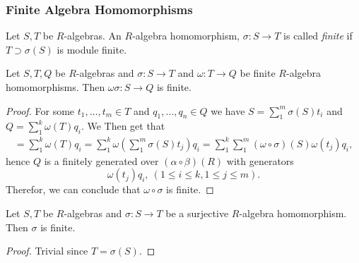 \subsubsection{Finite Algebra Homomorphisms}
    \begin{definition}
        Let $S,T$ be $R$-algebras. An $R$-algebra homomorphism, $\sigma: S\rightarrow T$ is called \textit{finite} if $T\supset \sigma(S)$ is module finite.   
    \end{definition}
    \begin{lemma}\label{CompositionOfFiniteAlgebraHomsIsFinite}
        Let $S,T,Q$ be $R$-algebras and $\sigma: S\rightarrow T$ and $\omega: T\rightarrow Q$ be finite $R$-algebra homomorphisms. Then $\omega\sigma : S\rightarrow Q$ is finite. 
    \end{lemma}
    \begin{proof}
        For some  $t_1,\dots,t_m\in T$ and $q_1,\dots,q_n\in Q$  we have $S=\sum_1^m \sigma(S)t_i$ and $Q=\sum_1^k \omega(T)q_i$. We Then get that 
        \begin{align*}
            = \sum_1^k \omega(T)q_i = \sum_1^k \omega\left(\sum_1^m \sigma(S)t_j\right)q_i =\sum_1^k\sum_1^m (\omega\circ\sigma)\left(S\right)\omega(t_j)q_i,  
        \end{align*}
        hence $Q$ is a finitely generated over $(\alpha\circ \beta)(R)$ with generators 
        $$\omega(t_j)q_i,\ (1\leq i\leq k, 1\leq j\leq m).$$
        Therefor, we can conclude that $\omega\circ \sigma$ is finite. 
    \end{proof}
    \begin{lemma}\label{SurjectiveAlgebraHomomorphismIsFinite}
        Let $S,T$ be $R$-algebras and $\sigma : S\rightarrow T$ be a surjective $R$-algebra homomorphism. Then $\sigma$ is finite. 
    \end{lemma}
    \begin{proof}
        Trivial since $T = \sigma(S)$.
    \end{proof}
